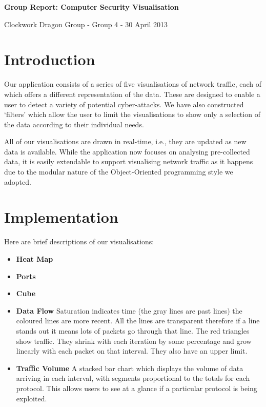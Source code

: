 \documentclass[12pt,a4paper]{article}
\begin{document}
	
	\begin{center}
		\textbf{Group Report: Computer Security Visualisation}
		
		Clockwork Dragon Group - Group 4 - 30 April 2013
	\end{center}
	\bigskip

    \section*{Introduction}
	Our application consists of a series of five visualisations of network traffic, each of which offers a different representation of the data. These are designed to enable a user to detect a variety of potential cyber-attacks. 
			We have also constructed `filters' which allow the user to limit the visualisations to show only a selection of the data according to their individual needs. 
			
			All of our visualisations are drawn in real-time, i.e., they are updated as new data is available. While the application now focuses on analysing pre-collected data, it is easily extendable to support visualising network traffic as it happens due to the modular nature of the Object-Oriented programming style we adopted.

    \section*{Implementation}
			Here are brief descriptions of our visualisations:
			
			\begin{itemize}
            
            \item \textbf{Heat Map}

            \item \textbf{Ports}

            \item \textbf{Cube}

            \item \textbf{Data Flow} Saturation indicates time (the gray lines are past lines) the coloured lines are more recent. All the lines are transparent therefore if a line stands out it means lots of packets go through that line. The red triangles show traffic. They shrink with each iteration by some percentage and grow linearly with each packet on that interval. They also have an upper limit.

            \item \textbf{Traffic Volume} A stacked bar chart which displays the volume of data arriving in each interval, with segments proportional to the totals for each protocol. This allows users to see at a glance if a particular protocol is being exploited.
            
            \end{itemize}
			
\end{document}
